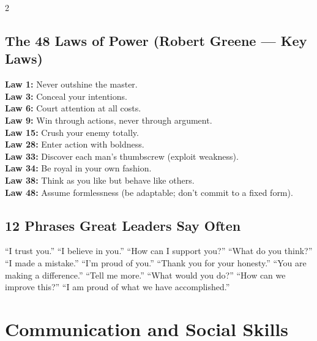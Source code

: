 \documentclass[10pt,a4paper]{article}
\begin{document}
\begin{multicols}{2}
\subsection{The 48 Laws of Power (Robert Greene --- Key Laws)}
\textbf{Law 1:} Never outshine the master.\\
\textbf{Law 3:} Conceal your intentions.\\
\textbf{Law 6:} Court attention at all costs.\\
\textbf{Law 9:} Win through actions, never through argument.\\
\textbf{Law 15:} Crush your enemy totally.\\
\textbf{Law 28:} Enter action with boldness.\\
\textbf{Law 33:} Discover each man's thumbscrew (exploit weakness).\\
\textbf{Law 34:} Be royal in your own fashion.\\
\textbf{Law 38:} Think as you like but behave like others.\\
\textbf{Law 48:} Assume formlessness (be adaptable; don't commit to a fixed form).

\subsection{12 Phrases Great Leaders Say Often}
``I trust you.'' ``I believe in you.'' ``How can I support you?'' ``What do you think?'' ``I made a mistake.'' ``I'm proud of you.'' ``Thank you for your honesty.'' ``You are making a difference.'' ``Tell me more.'' ``What would you do?'' ``How can we improve this?'' ``I am proud of what we have accomplished.''

\section{Communication and Social Skills}


\end{multicols}
\end{document}
